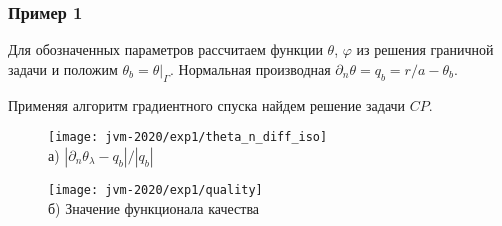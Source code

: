 \begin{frame}
    \frametitle{Пример 1}
    Для обозначенных параметров рассчитаем функции $\theta$, $\varphi$ из решения граничной задачи
    и положим $\theta_b = \theta|_\Gamma$.
    Нормальная производная $\partial_n \theta = q_b = r / a - \theta_b$.

    Применяя алгоритм градиентного спуска найдем решение задачи $CP$.
    \begin{figure}[h!t]
        \begin{minipage}[b][][b]{0.49\linewidth}
            \centering
            \texttt{[image: jvm-2020/exp1/theta\_n\_diff\_iso]}
            \\ а) $|\partial_n\theta_\lambda-q_b|/|q_b|$
        \end{minipage}
        \hfill
        \begin{minipage}[b][][b]{0.49\linewidth}
            \centering
            \texttt{[image: jvm-2020/exp1/quality]}
            \\ б) Значение функционала качества
        \end{minipage}
        \label{fig:4_4:0}
    \end{figure}
\end{frame}

